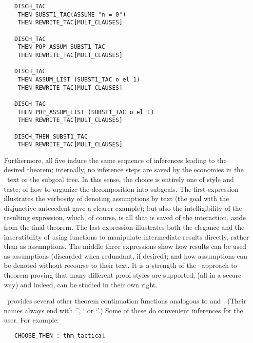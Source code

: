\begin{hol}
\begin{verbatim}
   DISCH_TAC
    THEN SUBST1_TAC(ASSUME "n = 0")
    THEN REWRITE_TAC[MULT_CLAUSES]

   DISCH_TAC
    THEN POP_ASSUM SUBST1_TAC
    THEN REWRITE_TAC[MULT_CLAUSES]

   DISCH_TAC
    THEN ASSUM_LIST (SUBST1_TAC o el 1)
    THEN REWRITE_TAC[MULT_CLAUSES]

   DISCH_TAC
    THEN POP_ASSUM_LIST (SUBST1_TAC o el 1)
    THEN REWRITE_TAC[MULT_CLAUSES]

   DISCH_THEN SUBST1_TAC
    THEN REWRITE_TAC[MULT_CLAUSES]
\end{verbatim}\end{hol}

\noindent Furthermore, all five induce the
same sequence of inferences leading to
the desired theorem; internally, no inference steps are saved by the
economies in the \ML\ text or the subgoal tree.  In this sense,
the choice is entirely one of style and taste;
of how to organize the decomposition into subgoals.
The first expression illustrates the verbosity of denoting
assumptions by text (the goal with the
disjunctive antecedent gave a clearer
example); but also
the intelligibility of the resulting expression, which, of course, is all
that is saved of the interaction, aside from the final theorem.
The last expression
illustrates both the elegance and the inscrutibility of
using functions to manipulate intermediate results directly, rather than
as assumptions.
The middle three expressions
show how results can be used as assumptions (discarded when
redundant, if desired); and how
assumptions can be denoted without
recourse to their text.
It is a strength of the \LCF\ approach
 to
theorem proving that many different proof styles are supported,
(all in a secure way) and indeed, can be studied in their own
right.

\HOL\ provides several other theorem continuation functions analogous to
 and .
(Their names always end with
`', ` or `'.)
Some of these do convenient inferences for the user.
For example:

\begin{boxed}\begin{verbatim}
   CHOOSE_THEN : thm_tactical
\end{verbatim}\end{boxed}

